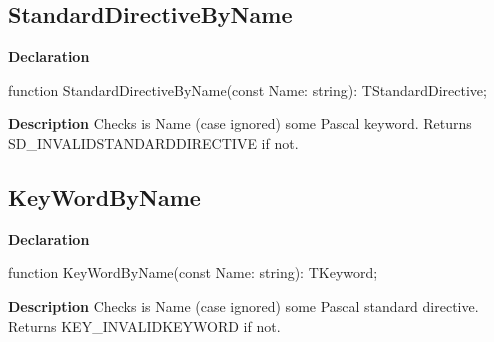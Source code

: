 \documentclass{report}
\newif\ifpdf
\begin{document}
\subsection*{StandardDirectiveByName}
\fi
\label{PasDoc_Tokenizer-StandardDirectiveByName}
\begin{list}{}{
\setlength{\itemindent}{0cm}
\setlength{\listparindent}{0cm}
\setlength{\leftmargin}{\evensidemargin}
\addtolength{\leftmargin}{\tmplength}
\settowidth{\labelsep}{X}
\addtolength{\leftmargin}{\labelsep}
\setlength{\labelwidth}{\tmplength}
}
\item[\textbf{Declaration}\hfill]
\ifpdf
\begin{flushleft}
\fi
\begin{ttfamily}
function StandardDirectiveByName(const Name: string): TStandardDirective;\end{ttfamily}

\ifpdf
\end{flushleft}
\fi

\par
\item[\textbf{Description}]
Checks is Name (case ignored) some Pascal keyword. Returns SD{\_}INVALIDSTANDARDDIRECTIVE if not.

\end{list}
\ifpdf
\subsection*{\large{\textbf{KeyWordByName}}\normalsize\hspace{1ex}\hrulefill}
\else
\subsection*{KeyWordByName}
\fi
\label{PasDoc_Tokenizer-KeyWordByName}
\begin{list}{}{
\setlength{\itemindent}{0cm}
\setlength{\listparindent}{0cm}
\setlength{\leftmargin}{\evensidemargin}
\addtolength{\leftmargin}{\tmplength}
\settowidth{\labelsep}{X}
\addtolength{\leftmargin}{\labelsep}
\setlength{\labelwidth}{\tmplength}
}
\item[\textbf{Declaration}\hfill]
\ifpdf
\begin{flushleft}
\fi
\begin{ttfamily}
function KeyWordByName(const Name: string): TKeyword;\end{ttfamily}

\ifpdf
\end{flushleft}
\fi

\par
\item[\textbf{Description}]
Checks is Name (case ignored) some Pascal standard directive. Returns KEY{\_}INVALIDKEYWORD if not.

\end{list}
\end{document}
